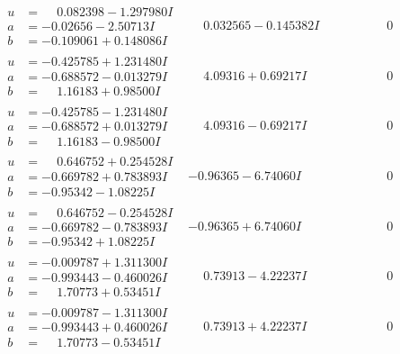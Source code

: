 \documentclass[1p]{elsarticle_modified}
\theoremstyle{definition}
\begin{document}
$$\begin{array}{c|c|c}
\begin{aligned}
u &= \phantom{-}0.082398 - 1.297980 I \\
a &= -0.02656 - 2.50713 I \\
b &= -0.109061 + 0.148086 I\end{aligned}
 & \phantom{-}0.032565 - 0.145382 I & \phantom{-0.000000 } 0 \\ \hline\begin{aligned}
u &= -0.425785 + 1.231480 I \\
a &= -0.688572 - 0.013279 I \\
b &= \phantom{-}1.16183 + 0.98500 I\end{aligned}
 & \phantom{-}4.09316 + 0.69217 I & \phantom{-0.000000 } 0 \\ \hline\begin{aligned}
u &= -0.425785 - 1.231480 I \\
a &= -0.688572 + 0.013279 I \\
b &= \phantom{-}1.16183 - 0.98500 I\end{aligned}
 & \phantom{-}4.09316 - 0.69217 I & \phantom{-0.000000 } 0 \\ \hline\begin{aligned}
u &= \phantom{-}0.646752 + 0.254528 I \\
a &= -0.669782 + 0.783893 I \\
b &= -0.95342 - 1.08225 I\end{aligned}
 & -0.96365 - 6.74060 I & \phantom{-0.000000 } 0 \\ \hline\begin{aligned}
u &= \phantom{-}0.646752 - 0.254528 I \\
a &= -0.669782 - 0.783893 I \\
b &= -0.95342 + 1.08225 I\end{aligned}
 & -0.96365 + 6.74060 I & \phantom{-0.000000 } 0 \\ \hline\begin{aligned}
u &= -0.009787 + 1.311300 I \\
a &= -0.993443 - 0.460026 I \\
b &= \phantom{-}1.70773 + 0.53451 I\end{aligned}
 & \phantom{-}0.73913 - 4.22237 I & \phantom{-0.000000 } 0 \\ \hline\begin{aligned}
u &= -0.009787 - 1.311300 I \\
a &= -0.993443 + 0.460026 I \\
b &= \phantom{-}1.70773 - 0.53451 I\end{aligned}
 & \phantom{-}0.73913 + 4.22237 I & \phantom{-0.000000 } 0 \\ \hline\begin{aligned}

\end{aligned}
\end{array}$$
\end{document}
